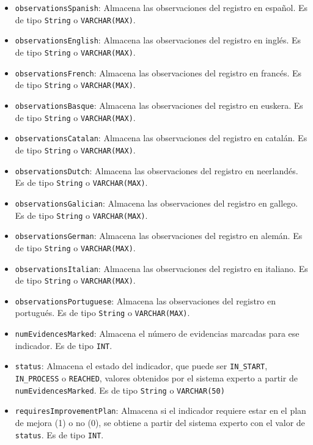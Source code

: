 \begin{itemize}
\begin{itemize}
      \item \texttt{observationsSpanish}: Almacena las observaciones del registro en español. Es de tipo \texttt{String} o \texttt{VARCHAR(MAX)}.
        \item \texttt{observationsEnglish}: Almacena las observaciones del registro en inglés. Es de tipo \texttt{String} o \texttt{VARCHAR(MAX)}.
        \item \texttt{observationsFrench}: Almacena las observaciones del registro en francés. Es de tipo \texttt{String} o \texttt{VARCHAR(MAX)}.
        \item \texttt{observationsBasque}: Almacena las observaciones del registro en euskera. Es de tipo \texttt{String} o \texttt{VARCHAR(MAX)}.
        \item \texttt{observationsCatalan}: Almacena las observaciones del registro en catalán. Es de tipo \texttt{String} o \texttt{VARCHAR(MAX)}.
        \item \texttt{observationsDutch}: Almacena las observaciones del registro en neerlandés. Es de tipo \texttt{String} o \texttt{VARCHAR(MAX)}.
        \item \texttt{observationsGalician}: Almacena las observaciones del registro en gallego. Es de tipo \texttt{String} o \texttt{VARCHAR(MAX)}.
        \item \texttt{observationsGerman}: Almacena las observaciones del registro en alemán. Es de tipo \texttt{String} o \texttt{VARCHAR(MAX)}.
        \item \texttt{observationsItalian}: Almacena las observaciones del registro en italiano. Es de tipo \texttt{String} o \texttt{VARCHAR(MAX)}.
        \item \texttt{observationsPortuguese}: Almacena las observaciones del registro en portugués. Es de tipo \texttt{String} o \texttt{VARCHAR(MAX)}.
      \item \texttt{numEvidencesMarked}: Almacena el número de evidencias marcadas para ese indicador. Es de tipo \texttt{INT}.
      \item \texttt{status}: Almacena el estado del indicador, que puede ser \texttt{IN\_START}, \texttt{IN\_PROCESS} o \texttt{REACHED}, valores obtenidos por el sistema experto a partir de \texttt{numEvidencesMarked}. Es de tipo \texttt{String} o \texttt{VARCHAR(50)}
      \item \texttt{requiresImprovementPlan}: Almacena si el indicador requiere estar en el plan de mejora (1) o no (0), se obtiene a partir del sistema experto con el valor de \texttt{status}. Es de tipo \texttt{INT}.  

\end{itemize}
\end{itemize}
